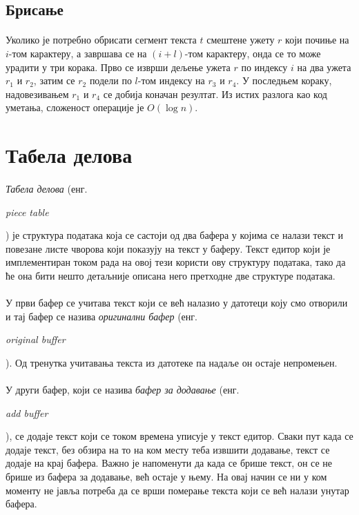 \documentclass[12pt,oneside]{memoir}
\begin{document}
\subsection{Брисање}
\paragraph{}
Уколико је потребно обрисати сегмент текста \(t\) смештене ужету \(r\) који почиње на \(i\)-том карактеру, а завршава се на \((i+l)\)-том карактеру, онда се то може урадити у три корака. Прво се изврши дељење ужета \(r\) по индексу \(i\) на два ужета \(r_1\) и
\(r_2\), затим се \(r_2\) подели по \(l\)-том индексу на \(r_3\) и \(r_4\). 
У последњем кораку, надовезивањем \(r_1\) и \(r_4\) се добија коначан резултат. 
Из истих разлога као код уметања, сложеност операције је \(O(\log{}n)\).

\section{Табела делова}
\paragraph{}
\emph{Табела делова} (енг. \begin{latinica}\textit{piece table}\end{latinica}) је структура података која се састоји од два бафера у којима се налази текст и повезане 
листе чворова који показују на текст у баферу. Текст едитор који је имплементиран током
рада на овој тези користи ову структуру података, тако да ће она бити нешто детаљније
описана него претходне две структуре података.

\paragraph{}
У први бафер се учитава текст који се већ налазио у датотеци коју смо отворили и тај 
бафер се назива \emph{оригинални бафер} 
(енг. \begin{latinica}\textit{original buffer}\end{latinica}). 
Од тренутка учитавања текста из датотеке па надаље он остаје непромењен. 

\paragraph{}
У други бафер, који се назива \emph{бафер за додавање} 
(енг. \begin{latinica}\textit{add buffer}\end{latinica}), 
се додаје текст који се током времена уписује у текст едитор. Сваки пут
када се додаје текст, без обзира на то на ком месту теба извшити додавање, 
текст се додаје на крај бафера. Важно је напоменути да када се брише текст, он се не 
брише из бафера за додавање, већ остаје у њему. На овај начин се ни у ком моменту не 
јавља потреба да се врши померање текста који се већ налази унутар бафера.
\end{document}
